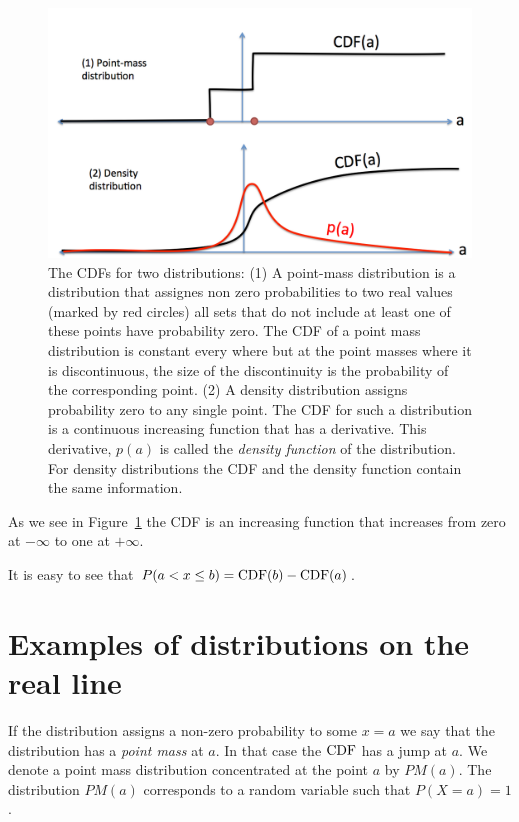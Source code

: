 \begin{figure}[h]
\begin{center}
\includegraphics[width=5in]{figs/CDFs.png}
\end{center}
\caption{The CDFs for two distributions: (1) A point-mass distribution
  is a distribution that assignes non zero probabilities to two real
  values (marked by red circles) all sets that do not include at least
  one of these points have probability zero. The CDF of a point mass
  distribution is constant every where but at the point masses where
  it is discontinuous, the size of the discontinuity is the
  probability of the corresponding point. (2) A density distribution
  assigns probability zero to any single point. The CDF for such a
  distribution is a continuous increasing function that has a
  derivative. This derivative, $p(a)$ is called the {\em density function} of
  the distribution. For density distributions the CDF and the density
  function contain the same information.\label{fig:CDF}}
\end{figure}

As we see in Figure~\ref{fig:CDF} the CDF is an increasing function that
increases from zero at $-\infty$ to one at $+\infty$.

It is easy to see that $P(a<x\leq b)=\mbox{CDF}(b)-\mbox{CDF}(a)$.


\section{Examples of distributions on the real line}
If the distribution assigns a non-zero probability to some $x=a$ we
say that the distribution has a {\em point mass} at $a$. In that case
the $\mbox{CDF}$ has a jump at $a$. We denote a point mass distribution
concentrated at the point $a$ by $PM(a)$. The distribution $PM(a)$
corresponds to a random variable such that $P(X=a)=1$.

